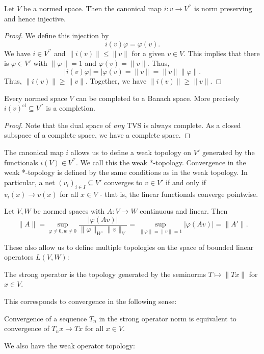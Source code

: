 \documentclass[twoside,symmetric, openany, 12pt]{./tuftebook}
\theoremstyle{definition}
\theoremstyle{definition}
\theoremstyle{definition}
\begin{document}
\begin{Theorem}
	Let $V$ be a normed space. Then the canonical map $i:v\to V^{\prime\prime}$ is norm preserving and hence injective.
\end{Theorem}
\begin{proof}
	We define this injection by
	\[
	i(v)\varphi = \varphi(v)
	.\] 
	We have $i\in V^{\prime\prime}$ and $\|i(v)\|\le \|v\|$ for a given $v\in V$. This implies that there is $\varphi\in V'$ with $\|\varphi\|=1$ and $\varphi(v)=\|v\|$. Thus,
\[
|i(v)\varphi|=|\varphi(v)=\|v\|=\|v\|\|\varphi\|
.\] 
Thus, $\|i(v)\|\ge \|v\|$. Together, we have $\|i(v)\|\ge \|v\|$.
\end{proof}
\begin{Theorem}
	Every normed space $V$ can be completed to a Banach space. More precisely $i(v)^\text{cl}\subseteq V^{\prime\prime}$ is a completion.
\end{Theorem}
\begin{proof}
	Note that the dual space of \emph{any} TVS is always complete. As a closed subspace of a complete space, we have a complete space.
\end{proof}
The canonical map $i$ allows us to define a weak topology on $V'$ generated by the functionals $i(V)\in V^{\prime\prime}$. We call this the weak *-topology. Convergence in the weak *-topology is defined by the same conditions as in the weak topology. In particular, a net $(v_i)_{i\in I}\subseteq V'$ converges to $v\in V'$ if and only if $v_i(x)\to v(x)$ for all $x\in V$ - that is, the linear functionals converge pointwise.
\begin{Theorem}
	Let $V,W$ be normed spaces with $A:V \to W$ continuous and linear. Then
	\[
		\|A\|= \sup_{\varphi\neq 0, w \neq 0}\frac{|\varphi(A v)|}{\|\varphi\|_{W'}\|v\|_V}=\sup_{\|\varphi\|=\|v\|=1} |\varphi(A v)|=\|A'\|
	.\] 
\end{Theorem}
These also allow us to define multiple topologies on the space of bounded linear operators $L(V,W)$:
\begin{Definition}
	The strong operator is the topology generated by the seminorms $T\mapsto \| Tx\|$ for $x\in V$.
\end{Definition}
This corresponds to convergence in the following sense:
\begin{Proposition}
	Convergence of a sequence $T_n$ in the strong operator norm is equivalent to convergence of $T_nx\to Tx$ for all $x\in V$.
\end{Proposition}
We also have the weak operator topology:
\end{document}

